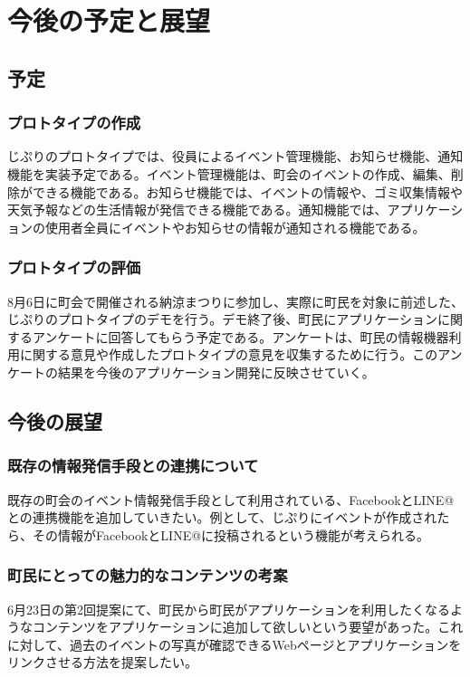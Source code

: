 \chapter{今後の予定と展望}

\section{予定}
\subsection{プロトタイプの作成}
じぷりのプロトタイプでは、役員によるイベント管理機能、お知らせ機能、通知機能を実装予定である。イベント管理機能は、町会のイベントの作成、編集、削除ができる機能である。お知らせ機能では、イベントの情報や、ゴミ収集情報や天気予報などの生活情報が発信できる機能である。通知機能では、アプリケーションの使用者全員にイベントやお知らせの情報が通知される機能である。
\subsection{プロトタイプの評価}
8月6日に町会で開催される納涼まつりに参加し、実際に町民を対象に前述した、じぷりのプロトタイプのデモを行う。デモ終了後、町民にアプリケーションに関するアンケートに回答してもらう予定である。アンケートは、町民の情報機器利用に関する意見や作成したプロトタイプの意見を収集するために行う。このアンケートの結果を今後のアプリケーション開発に反映させていく。

\section{今後の展望}
\subsection{既存の情報発信手段との連携について}
既存の町会のイベント情報発信手段として利用されている、FacebookとLINE@との連携機能を追加していきたい。例として、じぷりにイベントが作成されたら、その情報がFacebookとLINE@に投稿されるという機能が考えられる。
\subsection{町民にとっての魅力的なコンテンツの考案}
6月23日の第2回提案にて、町民から町民がアプリケーションを利用したくなるようなコンテンツをアプリケーションに追加して欲しいという要望があった。これに対して、過去のイベントの写真が確認できるWebページとアプリケーションをリンクさせる方法を提案したい。
